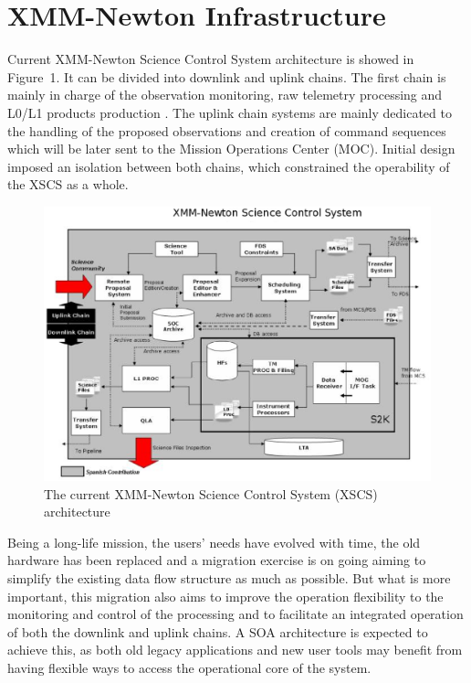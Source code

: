 \section{XMM-Newton Infrastructure}
Current XMM-Newton Science Control System architecture is showed in Figure~1. It can be divided into downlink and uplink chains. The first chain is mainly in charge of the observation monitoring, raw telemetry processing and L0/L1 products production \citep{vallejo11}. The uplink chain systems are mainly dedicated to the handling of the proposed observations and creation of command sequences which will be later sent to the Mission Operations Center (MOC). Initial design imposed an isolation between both chains, which constrained the operability of the XSCS as a whole. 
\begin{figure}[ht]
\centering
\includegraphics[width=90 mm]{part10/Perez_P022/P022_f1.eps}
\caption{The current XMM-Newton Science Control System (XSCS) architecture}
\label{fig:1}
\end{figure}
Being a long-life mission, the users' needs have evolved with time, the old hardware has been replaced and a migration exercise is on going aiming to simplify the existing data flow structure as much as possible. But what is more important, this migration also aims to improve the operation flexibility to the monitoring and control of the processing and to facilitate an integrated operation of both the downlink and uplink chains. A SOA architecture is expected to achieve this, as both old legacy applications and new user tools may benefit from having flexible ways to access the operational core of the system. 

